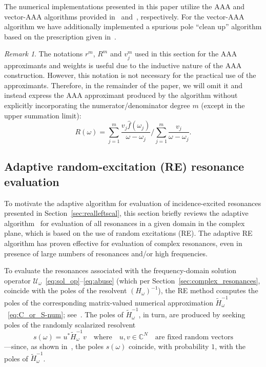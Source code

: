 \documentclass[11pt]{article}
\theoremstyle{plain}
\theoremstyle{remark}
\newtheorem{remark}{Remark}
\def \C{\mathbb{C}}
\begin{document}
The numerical implementations presented in this paper utilize the AAA
and vector-AAA algorithms provided in~\cite{chebfun}
and~\cite{lietaert2022automatic}, respectively. For the vector-AAA algorithm we have additionally implemented a spurious pole ``clean up'' algorithm based on the prescription given in~\cite{AAA}.
\begin{remark}\label{AAA_notat_usage}
  The notations $r^m$, $R^m$ and $v^m_j$ used in this section for the
  AAA approximants and weights is useful due to the inductive nature
  of the AAA construction. However, this notation is not necessary for
  the practical use of the approximants. Therefore, in the remainder
  of the paper, we will omit it and instead express the AAA
  approximant produced by the algorithm without explicitly
  incorporating the numerator/denominator degree $m$ (except in the
  upper summation limit):
  \begin{equation}\label{eqn:rat_approx_vec_no-exp}
    R(\omega) = \sum_{j=1}^m \frac{v_j \widehat{f}(\omega_j)}{\omega - \omega_j} \bigg/   \sum_{j=1}^{m} \frac{v_j}{\omega - \omega_j}.
\end{equation}
\end{remark}

\subsection{Adaptive random-excitation (RE) resonance evaluation}\label{sec:adaptiveres}
To motivate the adaptive algorithm for evaluation of incidence-excited
resonances presented in Section~\ref{sec:realleftscal}, this section
briefly reviews the adaptive algorithm~\cite[Algorithm 2]{bst} for
evaluation of all resonances in a given domain in the complex plane,
which is based on the use of random excitations (RE). The adaptive RE
algorithm has proven effective for evaluation of complex resonances,
even in presence of large numbers of resonances and/or high
frequencies.

To evaluate the resonances associated with the frequency-domain
solution operator
$\mathcal{U}_\omega$~\eqref{eq:sol_op}--\eqref{eq:abuse} (which per
Section~\ref{sec:complex_resonances}, coincide with the poles of the
resolvent $(H_{\omega})^{-1}$), the RE method computes the poles of
the corresponding matrix-valued numerical approximation
$\widetilde{H}_\omega^{-1}$~\eqref{eq:C_or_S-num};
see~\cite[Rem. 2]{bst}. The poles of $\widetilde{H}_\omega^{-1}$, in
turn, are produced by seeking poles of the randomly scalarized
resolvent
\begin{equation*}
    s(\omega) = u^*\widetilde{H}_\omega^{-1}v \quad \text{where} \quad {u,v \in \C^N} \quad \text{are fixed random vectors}
\end{equation*}
---since, as shown in~\cite{bst}, the poles $s(\omega)$ coincide, with
probability $1$, with the poles of $\widetilde{H}_\omega^{-1}$.
\end{document}
